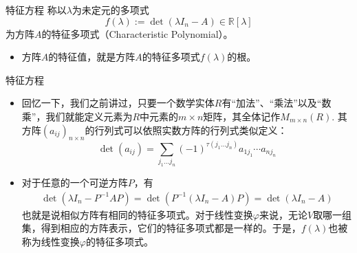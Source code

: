 
\begin{frame}

\begin{block}{特征方程}
称以$\lambda$为未定元的多项式
\[f(\lambda) := \det(\lambda I_n - A) \in \mathbb{R}[\lambda]\]
为方阵$A$的特征多项式（Characteristic Polynomial）。

\vspace{2em}
\pause

\begin{itemize}
\item 方阵$A$的特征值，就是方阵$A$的特征多项式$f(\lambda)$的根。
\end{itemize}
\end{block}

\end{frame}


\begin{frame}

\begin{block}{特征方程}
\begin{itemize}
\item 回忆一下，我们之前讲过，只要一个数学实体$R$有``加法''、``乘法''以及``数乘''，我们就能定义元素为$R$中元素的$m\times n$矩阵，其全体记作$M_{m\times n}(R)$. 其方阵$(a_{ij})_{n\times n}$的行列式可以依照实数方阵的行列式类似定义：
\[\det(a_{ij}) = \sum\limits_{j_1\ldots j_n} (-1)^{\tau(j_1\ldots j_n)} a_{1j_1}\cdots a_{nj_n}\]
\item 对于任意的一个可逆方阵$P$，有
\begin{align*}
\det(\lambda I_n - P^{-1}AP) = \det (P^{-1}(\lambda I_n - A)P) = \det(\lambda I_n - A)
\end{align*}
也就是说相似方阵有相同的特征多项式。对于线性变换$\varphi$来说，无论$V$取哪一组集，得到相应的方阵表示，它们的特征多项式都是一样的。于是，$f(\lambda)$也被称为线性变换$\varphi$的特征多项式。
\end{itemize}
\end{block}

\end{frame}


